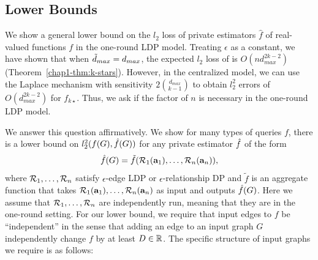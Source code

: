 \subsection{Lower Bounds}
\label{chap1-sub:lower_bounds}

We show a general lower bound on the $l_2$ loss of private estimators $\hat{f}$ of
real-valued functions $f$ in the one-round LDP model. Treating $\epsilon$ as a
constant, we have shown that 
when $\tilde{d}_{max}=d_{max}$, 
the expected $l_2$ loss of  is 
$O(nd_{max}^{2k-2})$
(Theorem~\ref{chap1-thm:k-stars}). 
However, in
the centralized 
model, we can use
the Laplace mechanism with sensitivity 
$2\binom{d_{max}}{k-1}$ 
to obtain $l_2^2$ errors of $O(d_{max}^{2k-2})$ 
for $f_{k\star}$. 
Thus, we ask
if 
the factor of $n$ is 
necessary 
in the one-round LDP model.

We 
answer this question affirmatively.
We show for many types of queries $f$, there is a lower bound on 
$l_2^2(f(G), \hat{f}(G))$ 
for any private estimator $\hat{f}$ of the form
\begin{equation}\label{chap1-eq:one-round-lower}
  \hat{f}(G) = \tilde{f}(\mathcal{R}_1(\mathbf{a}_1), \ldots, \mathcal{R}_n(\mathbf{a}_n)),
\end{equation}
where 
$\mathcal{R}_1, \ldots, \mathcal{R}_n$ satisfy 
$\epsilon$-edge LDP or $\epsilon$-relationship DP 
and $\tilde{f}$ is an aggregate function that takes $\mathcal{R}_1(\mathbf{a}_1), \ldots, \mathcal{R}_n(\mathbf{a}_n)$ as input and outputs $\hat{f}(G)$. 
Here we assume that $\mathcal{R}_1, \ldots, \mathcal{R}_n$ 
are independently run, meaning that they are in the one-round
setting.
% 
% 
For our 
lower bound,
we 
require 
that 
input edges to $f$ 
be ``independent'' in the sense that 
adding an edge to an input graph $G$  
independently 
change 
$f$ by at least $D \in \mathbb{R}$. 
The specific structure of input graphs we require is as follows:

